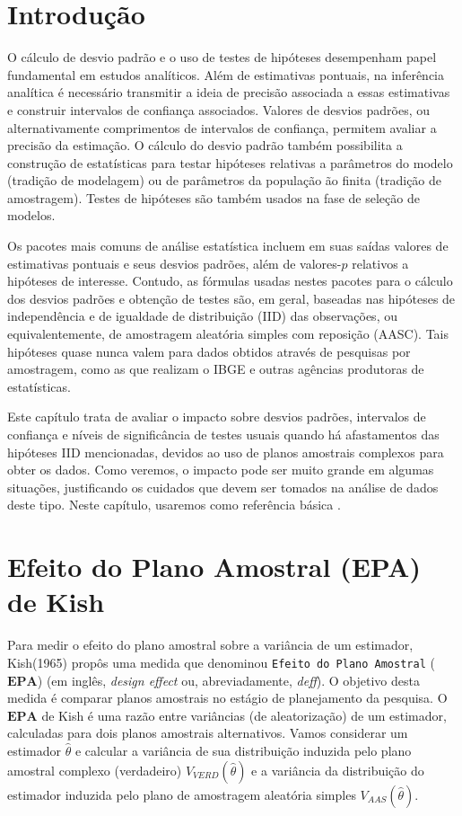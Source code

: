 \documentclass[]{book}
\theoremstyle{definition}
\theoremstyle{definition}
\theoremstyle{definition}
\theoremstyle{remark}
\begin{document}
\section{Introdução}\label{introducao}

O cálculo de desvio padrão e o uso de testes de hipóteses desempenham
papel fundamental em estudos analíticos. Além de estimativas pontuais,
na inferência analítica é necessário transmitir a ideia de precisão
associada a essas estimativas e construir intervalos de confiança
associados. Valores de desvios padrões, ou alternativamente comprimentos
de intervalos de confiança, permitem avaliar a precisão da estimação. O
cálculo do desvio padrão também possibilita a construção de estatísticas
para testar hipóteses relativas a parâmetros do modelo (tradição de
modelagem) ou de parâmetros da população ão finita (tradição de
amostragem). Testes de hipóteses são também usados na fase de seleção de
modelos.

Os pacotes mais comuns de análise estatística incluem em suas saídas
valores de estimativas pontuais e seus desvios padrões, além de
valores-\(p\) relativos a hipóteses de interesse. Contudo, as fórmulas
usadas nestes pacotes para o cálculo dos desvios padrões e obtenção de
testes são, em geral, baseadas nas hipóteses de independência e de
igualdade de distribuição (IID) das observações, ou equivalentemente, de
amostragem aleatória simples com reposição (AASC). Tais hipóteses quase
nunca valem para dados obtidos através de pesquisas por amostragem, como
as que realizam o IBGE e outras agências produtoras de estatísticas.

Este capítulo trata de avaliar o impacto sobre desvios padrões,
intervalos de confiança e níveis de significância de testes usuais
quando há afastamentos das hipóteses IID mencionadas, devidos ao uso de
planos amostrais complexos para obter os dados. Como veremos, o impacto
pode ser muito grande em algumas situações, justificando os cuidados que
devem ser tomados na análise de dados deste tipo. Neste capítulo,
usaremos como referência básica \citep{Sk89a}.

\section{Efeito do Plano Amostral (EPA) de
Kish}\label{efeito-do-plano-amostral-epa-de-kish}

Para medir o efeito do plano amostral sobre a variância de um estimador,
Kish(1965) propôs uma medida que denominou
\texttt{Efeito\ do\ Plano\ Amostral} (\(\mathbf{EPA}\)) (em inglês,
\emph{design effect} ou, abreviadamente, \emph{deff}). O objetivo desta
medida é comparar planos amostrais no estágio de planejamento da
pesquisa. O \(\mathbf{EPA}\) de Kish é uma razão entre variâncias (de
aleatorização) de um estimador, calculadas para dois planos amostrais
alternativos. Vamos considerar um estimador \(\hat{\theta}\) e calcular
a variância de sua distribuição induzida pelo plano amostral complexo
(verdadeiro) \(V_{VERD}\left( \hat{\theta}\right)\) e a variância da
distribuição do estimador induzida pelo plano de amostragem aleatória
simples \(V_{AAS}\left(\hat{\theta}\right)\).
\end{document}
